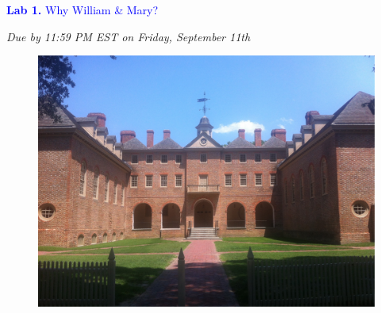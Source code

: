 \documentclass{article}
\begin{document}
\vspace*{.01mm}

\begin{center}

\Large{\textcolor{blue}{\textbf{Lab 1.}  Why William \& Mary?}}

\vspace{4mm}

\textit{Due by 11:59 PM EST on Friday, September 11th}\\

\end{center}

\begin{figure}[h!]
\begin{center}
\includegraphics[width=1.0\textwidth]{wm_wrenbldg.jpg}

\end{center}
\end{figure}

\setlength{\parindent}{0cm}
\end{document}
